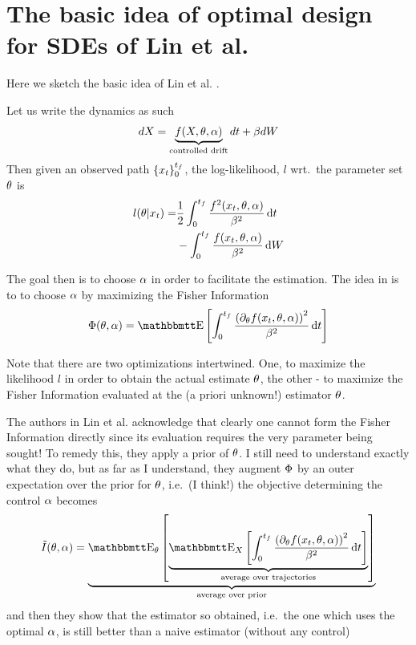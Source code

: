\documentclass{article}
\begin{document}
\appendix
\section{The basic idea of optimal design for SDEs of Lin et al.}
Here we sketch the basic idea of Lin et al. \cite{Lin}. 

Let us write the dynamics as such
\begin{equation}
dX = \underbrace{f(X,{\theta}, {\alpha})}_{\textrm{controlled drift}}dt
+ {\beta} dW
\end{equation}
Then given an observed path $\{x_t\}_0^{ t_f }$, the log-likelihood, $l$ wrt.\ the
parameter set ${\theta}$ is
\begin{align}
l({\theta} | x_t) =&  \frac 12 \int_0^{ t_f } \frac{f^2(x_t,{\theta}, {\alpha})}{{\beta}^2} \, \mathrm{d} t
\notag
\\
&- \int_0^{ t_f }  \frac{f(x_t,{\theta}, {\alpha})}{{\beta}^2} \, \mathrm{d} W
\label{eq:log_likelihood_cts_time}
\end{align}

The goal then is to choose ${\alpha}$ in order to facilitate the estimation. The idea
in \cite{Lin} is to to choose ${\alpha}$ by maximizing the Fisher Information
\begin{equation}
\FI(\th, \a) = \Exp \left[ \int_0^\tf \frac{ \left( \di_\th f(x_t,\th, \a)
\right)^2}{\b^2}
\intd{t}
\right]
\label{eq:Fisher_Information}
\end{equation}

Note that there are two optimizations intertwined. One, to maximize
the likelihood $l$ in order to obtain the actual estimate ${\theta}$, the other - to
maximize the Fisher Information evaluated at the (a priori unknown!) estimator ${\theta}$.

The authors in Lin et al. \cite{Lin} acknowledge that clearly one cannot form
the Fisher Information directly since its evaluation requires the very
parameter being sought! To remedy this, they apply a prior of ${\theta}$. I
still need to understand exactly what they do, but as far as I understand, they
augment ${\Phi}$ by an outer expectation over the prior for ${\theta}$, i.e.\ (I think!) 
the objective determining the control ${\alpha}$ becomes
\begin{equation}
\tilde{I}(\th, \a) = \underbrace{\Exp_\th \left [
\underbrace{\Exp_{X} \left[ \int_0^\tf
\frac{ \left( \di_\th f(x_t,\th, \a) \right)^2}{\b^2}
\intd{t}
\right]}_{\textrm{average over trajectories}}
\right]}_{\textrm{average over prior}}
\label{eq:Fisher_Information}
\end{equation}
and then they show that the estimator so obtained, i.e.\ the one which uses the
optimal ${\alpha}$, is still better than a naive estimator (without any control)
\end{document}
